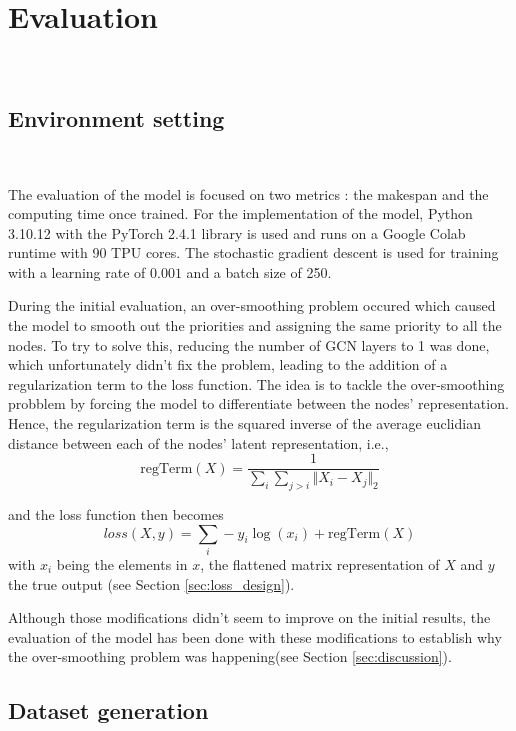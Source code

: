 \section{Evaluation}
~

\subsection{Environment setting}
~

The evaluation of the model is focused on two metrics : the makespan and the computing time once trained.
For the implementation of the model, Python 3.10.12 with the PyTorch 2.4.1 library is used and runs on a Google Colab runtime
with 90 TPU cores.
The stochastic gradient descent is used for training with a learning rate of $0.001$ and a batch size of 250.

During the initial evaluation, an over-smoothing problem\cite{chen2020oversmoothing} occured which caused 
the model to smooth out the priorities and assigning the same priority to all the nodes.
To try to solve this, reducing the number of GCN layers to 1 was done,
which unfortunately didn't fix the problem, leading to the addition
of a regularization term to the loss function.
The idea is to tackle the over-smoothing probblem by forcing the model
to differentiate between the nodes' representation.
Hence, the regularization term is the squared inverse of the average euclidian distance 
between each of the nodes' latent representation, i.e., 
\begin{equation}
    \text{regTerm}(X) = \frac{1}{\sum_{i}\sum_{j > i} \Vert X_i - X_j\Vert_{2} }
\end{equation}
    
and the loss function then becomes
\begin{equation}
    loss(X, y) = \sum_{i} -y_i\log(x_i) + \text{regTerm}(X)
\end{equation}
with $x_i$ being the elements in $x$, the flattened matrix representation of $X$
and $y$ the true output (see Section \ref{sec:loss_design}).

Although those modifications didn't seem to improve on the initial results,
the evaluation of the model has been done with these modifications
to establish why the over-smoothing problem was happening(see Section \ref{sec:discussion}).

\subsection{Dataset generation}
~

